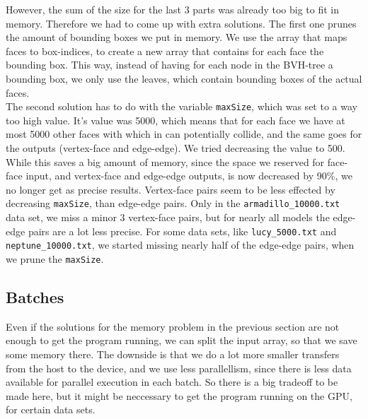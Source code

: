 However, the sum of the size for the last 3 parts was already too big to fit in memory. Therefore we had to come up with extra solutions. The first one prunes the amount of bounding boxes we put in memory. We use the array that maps faces to box-indices, to create a new array that contains for each face the bounding box. This way, instead of having for each node in the BVH-tree a bounding box, we only use the leaves, which contain bounding boxes of the actual faces.\\

The second solution has to do with the variable \texttt{maxSize}, which was set to a way too high value. It's value was 5000, which means that for each face we have at most 5000 other faces with which in can potentially collide, and the same goes for the outputs (vertex-face and edge-edge). We tried decreasing the value to 500. While this saves a big amount of memory, since the space we reserved for face-face input, and vertex-face and edge-edge outputs, is now decreased by 90\%, we no longer get as precise results. Vertex-face pairs seem to be less effected by decreasing \texttt{maxSize}, than edge-edge pairs. Only in the \texttt{armadillo\_10000.txt} data set, we miss a minor 3 vertex-face pairs, but for nearly all models the edge-edge pairs are a lot less precise. For some data sets, like \texttt{lucy\_5000.txt} and \texttt{neptune\_10000.txt}, we started missing nearly half of the edge-edge pairs, when we prune the \texttt{maxSize}.

\subsection{Batches}
Even if the solutions for the memory problem in the previous section are not enough to get the program running, we can split the input array, so that we save some memory there. The downside is that we do a lot more smaller transfers from the host to the device, and we use less parallellism, since there is less data available for parallel execution in each batch. So there is a big tradeoff to be made here, but it might be neccessary to get the program running on the GPU, for certain data sets.\\

